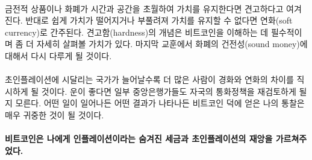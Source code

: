 \paragraph{}
금전적 상품이나 화폐가 시간과 공간을 초월하여 가치를 유지한다면 견고하다고 여겨진다. 
반대로 쉽게 가치가 떨어지거나 부풀려져 가치를 유지할 수 없다면 연화(soft currency)로 간주된다. 
견고함(hardness)의 개념은 비트코인을 이해하는 데 필수적이며 좀 더 자세히 살펴볼 가치가 있다.
마지막 교훈에서 화폐의 건전성(sound money)에 대해서 다시 다루게 될 것이다.


\paragraph{}
초인플레이션에 시달리는 국가가 늘어날수록 더 많은 사람이 경화와 연화의 차이를 직시하게 될 것이다. 
운이 좋다면 일부 중앙은행가들도 자국의 통화정책을 재검토하게 될지 모른다. 
어떤 일이 일어나든 어떤 결과가 나타나든 비트코인 덕에 얻은 나의 통찰은 매우 귀중한 것이 될 것이다.

\paragraph{비트코인은 나에게 인플레이션이라는 숨겨진 세금과 초인플레이션의 재앙을 가르쳐주었다.}

